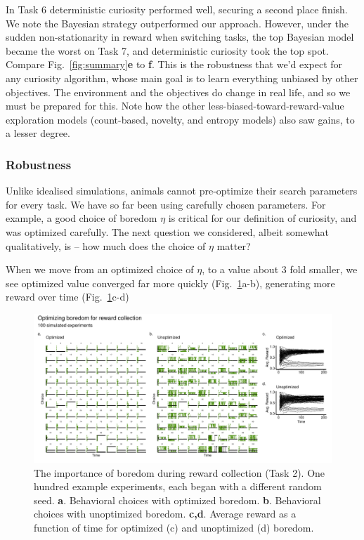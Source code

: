 In Task 6 deterministic curiosity performed well, securing a second place finish. We note the Bayesian strategy  outperformed our approach. However, under the sudden non-stationarity in reward when switching tasks, the top Bayesian model became the worst on Task 7, and deterministic curiosity took the top spot. Compare Fig.~\ref{fig:summary}\textbf{e} to \textbf{f}. This is the robustness that we'd expect for any curiosity algorithm, whose main goal is to learn everything unbiased by other objectives. The environment and the objectives do change in real life, and so we must be prepared for this. Note how the other less-biased-toward-reward-value exploration models (count-based, novelty, and entropy models) also saw gains, to a lesser degree.

\subsubsection*{Robustness}
Unlike idealised simulations, animals cannot pre-optimize their search parameters for every task. We have so far been using carefully chosen parameters. For example, a good choice of boredom $\eta$ is critical for our definition of curiosity, and was optimized carefully. The next question we considered, albeit somewhat qualitatively, is -- how much does the choice of $\eta$ matter? 

When we move from an optimized choice of $\eta$, to a value about 3 fold smaller, we see optimized value converged far more quickly (Fig.~\ref{fig:boredom2}a-b), generating more reward over time (Fig.~\ref{fig:boredom2}c-d)

\begin{figure}
    \label{fig:boredom2} 
	\includegraphics[width=11.4cm]{img/boredom2.pdf} 
	\caption{The importance of boredom during reward collection (Task 2). One hundred example experiments, each began with a different random seed. 
	\textbf{a}. Behavioral choices with optimized boredom.
	\textbf{b}. Behavioral choices with unoptimized boredom.
	\textbf{c,d}. Average reward as a function of time for optimized (c) and unoptimized (d) boredom.
	}
	\label{fig:boredom2} 
\end{figure}


